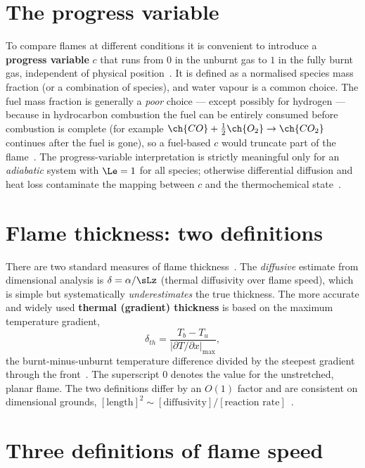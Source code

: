 \section{The progress variable}

To compare flames at different conditions it is convenient to introduce a \textbf{progress variable} $c$ that runs from $0$ in the unburnt gas to $1$ in the fully burnt gas, independent of physical position~\cite{transcript_l9}. It is defined as a normalised species mass fraction (or a combination of species), and water vapour is a common choice. The fuel mass fraction is generally a \emph{poor} choice --- except possibly for hydrogen --- because in hydrocarbon combustion the fuel can be entirely consumed before combustion is complete (for example $\ch{CO}+\tfrac12\ch{O_2}\rightarrow\ch{CO_2}$ continues after the fuel is gone), so a fuel-based $c$ would truncate part of the flame~\cite{transcript_l9}. The progress-variable interpretation is strictly meaningful only for an \emph{adiabatic} system with $\Le=1$ for all species; otherwise differential diffusion and heat loss contaminate the mapping between $c$ and the thermochemical state~\cite{transcript_l9}.

\section{Flame thickness: two definitions}

There are two standard measures of flame thickness~\cite{transcript_l9}. The \emph{diffusive} estimate from dimensional analysis is $\delta=\alpha/\sLz$ (thermal diffusivity over flame speed), which is simple but systematically \emph{underestimates} the true thickness. The more accurate and widely used \textbf{thermal (gradient) thickness} is based on the maximum temperature gradient,
\begin{equation}
\delta_{th}=\frac{T_b-T_u}{\left|\partial T/\partial x\right|_{\max}},
\label{eq:thermal-thickness}
\end{equation}
the burnt-minus-unburnt temperature difference divided by the steepest gradient through the front~\cite{lecture8,lecture9}. The superscript $0$ denotes the value for the unstretched, planar flame. The two definitions differ by an $O(1)$ factor and are consistent on dimensional grounds, $[\text{length}]^2\sim[\text{diffusivity}]/[\text{reaction rate}]$~\cite{transcript_l9}.

\section{Three definitions of flame speed}

